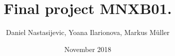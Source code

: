 

\onehalfspacing

\title{Final project MNXB01.}
\author{Daniel Nastasijevic, Yoana Ilarionova, Markus M{\"u}ller}
\date{November 2018}



	\maketitle
	
	
	
	
	
	

